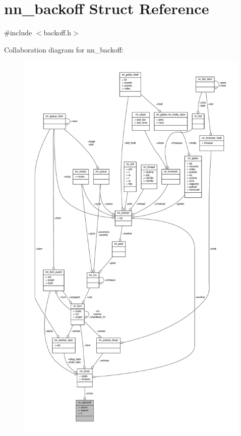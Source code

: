 \hypertarget{structnn__backoff}{}\section{nn\+\_\+backoff Struct Reference}
\label{structnn__backoff}


{\ttfamily \#include $<$backoff.\+h$>$}



Collaboration diagram for nn\+\_\+backoff\+:\nopagebreak
\begin{figure}[H]
\begin{center}
\leavevmode
\includegraphics[height=550pt]{structnn__backoff__coll__graph}
\end{center}
\end{figure}
